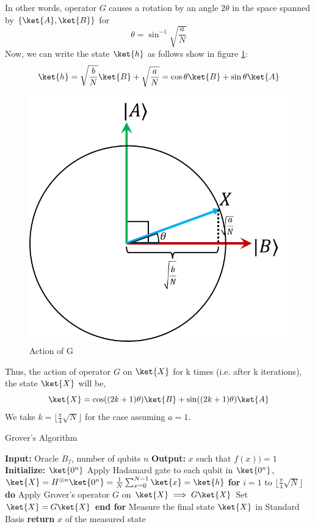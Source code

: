 \documentclass[12pt, oneside]{book}
\theoremstyle{definition}
\theoremstyle{definition}
\theoremstyle{remark}
\begin{document}
In other words, operator $G$ causes a rotation by an angle $2\theta$  in the space spanned by $\{\ket{A},\ket{B}\}$ for
\[
\theta = \sin^{-1} \sqrt{\frac{a}{N}}
\]
Now, we can write the state $\ket{h}$ as follows show in figure \ref{fig:groverfig}:
\[
\ket{h}=\sqrt{\frac{b}{N}}\ket{B}+\sqrt{\frac{a}{N}}=\cos \theta \ket{B} + \sin \theta \ket{A}
\]
\begin{figure}[H]
    \centering
    \includegraphics[width=0.6\linewidth]{../images/groverfig.png}
    \caption{Action of G}
    \label{fig:groverfig}
\end{figure}
Thus, the action of operator $G$ on $\ket{X}$ for k times (i.e. after k iterations), the state $\ket{X}$ will be,
\[
\ket{X}=\cos ((2k+1)\theta) \ket{B} + \sin((2k+1)\theta) \ket{A}
\]
We take $k=\lfloor \frac{\pi}{4}\sqrt{N}\rfloor$ for the case assuming $a=1$.
\begin{algorithm}
    \caption{Grover's Algorithm}
    \begin{algorithmic}[1]
    \State \textbf{Input:} Oracle $B_f$, number of qubits $n$
    \State \textbf{Output:} $x$ such that $f(x)) = 1$
    \State \textbf{Initialize:} $\ket{0^n}$
    \State Apply Hadamard gate to each qubit in $\ket{0^n}$, $\ket{X}=H^{\otimes n}\ket{0^n}=\frac{1}{N}\sum_{x=0}^{N-1}\ket{x}=\ket{h}$
    \State \textbf{for} $i = 1$ to $\lfloor \frac{\pi}{4}\sqrt{N} \rfloor$ \textbf{do}
    \State \hspace{1em} Apply Grover's operator $G$ on $\ket{X} \implies G\ket{X}$
    \State \hspace{1em} Set $\ket{X}=G\ket{X}$
    \State \textbf{end for}
    \State Measure the final state $\ket{X}$ in Standard Basis
    \State \textbf{return} $x$ of the measured state
    \end{algorithmic}
\end{algorithm}
\end{document}
